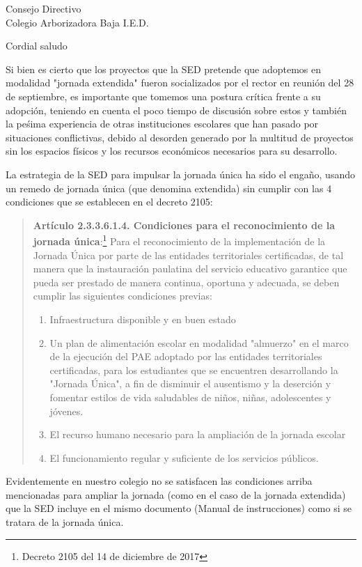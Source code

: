 \documentclass[letterpaper,spanish]{letter}
\date{9 de noviembre de 2018}
\begin{document}
	\begin{letter}{Consejo Directivo\\Colegio Arborizadora Baja I.E.D.}
		\opening{Cordial saludo}
Si bien es cierto que los proyectos que la SED pretende que adoptemos en modalidad "jornada extendida" fueron socializados por el rector en reunión del 28 de septiembre, es importante que tomemos una postura crítica frente a su adopción, teniendo en cuenta el poco tiempo de discusión sobre estos y también la peśima experiencia de otras instituciones escolares que han pasado por situaciones conflictivas, debido al desorden generado por la multitud de proyectos sin los espacios físicos y los recursos económicos necesarios para su desarrollo.

La estrategia de la SED para impulsar la jornada única ha sido el
engaño, usando un remedo de jornada única (que denomina extendida) sin cumplir con las 4 condiciones que se establecen en el decreto 2105:
\begin{quotation}
\textbf{Artículo 2.3.3.6.1.4. Condiciones para el reconocimiento de la jornada única}:\footnote{Decreto 2105 del 14 de diciembre de 2017} Para el reconocimiento de la implementación de la Jornada Única por parte de las entidades territoriales certificadas, de tal manera que la instauración paulatina del servicio educativo garantice que pueda ser prestado de manera continua, oportuna y adecuada, se deben cumplir las siguientes condiciones previas: 
\begin{enumerate}
\item Infraestructura disponible y en buen estado
\item  Un plan de alimentación escolar en modalidad "almuerzo" en el marco de la ejecución del PAE adoptado por las entidades territoriales certificadas, para los estudiantes que se encuentren desarrollando la "Jornada Única", a fin de disminuir el ausentismo y la deserción y fomentar estilos de vida saludables de niños, niñas, adolescentes y jóvenes.
\item El recurso humano necesario para la ampliación de la jornada escolar
\item  El funcionamiento regular y suficiente de los servicios públicos.
\end{enumerate}
\end{quotation}
Evidentemente en nuestro colegio no se satisfacen las condiciones arriba mencionadas para ampliar la jornada (como en el caso de la jornada extendida) que la SED incluye en el mismo documento (Manual de instrucciones) como si se tratara de la jornada única.


\end{letter}
\end{document}
